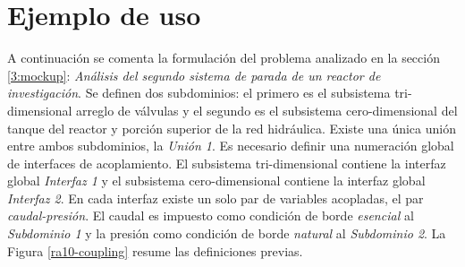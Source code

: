 \section{Ejemplo de uso}
\label{ap1:ejemplo}

A continuación se comenta la formulación del problema analizado en la sección \ref{3:mockup}:
\textit{Análisis del segundo sistema de parada de un reactor de investigación}.
Se definen dos subdominios: el primero es el subsistema tri-dimensional arreglo de válvulas y el segundo es el subsistema cero-dimensional del tanque del reactor y porción superior de la red hidráulica.
Existe una única unión entre ambos subdominios, la \textit{Unión 1}.
Es necesario definir una numeración global de interfaces de acoplamiento.
El subsistema tri-dimensional contiene la interfaz global \textit{Interfaz 1} y el subsistema cero-dimensional contiene la interfaz global \textit{Interfaz 2}.
En cada interfaz existe un solo par de variables acopladas, el par \textit{caudal-presión}.
El {caudal} es impuesto como condición de borde \textit{esencial} al \textit{Subdominio 1} y la {presión} como condición de borde \textit{natural} al \textit{Subdominio 2}.
La Figura \ref{ra10-coupling} resume las definiciones previas.


